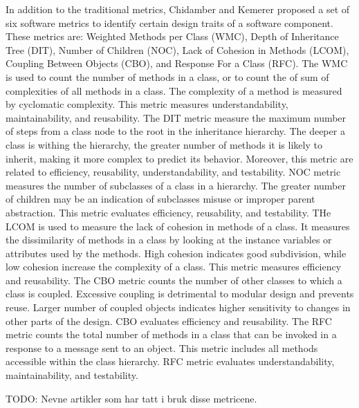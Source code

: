 In addition to the traditional metrics, Chidamber and Kemerer\cite{chidamber1994metrics} proposed a set of six software metrics to identify certain design traits of a software component. These metrics are: Weighted Methods per Class (WMC), Depth of Inheritance Tree (DIT), Number of Children (NOC), Lack of Cohesion in Methods (LCOM), Coupling Between Objects (CBO), and Response For a Class (RFC). The WMC is used to count the number of methods in a class, or to count the of sum of complexities of all methods in a class. The complexity of a method is measured by cyclomatic complexity. This metric measures understandability, maintainability, and reusability\cite{quenelobject}. The DIT metric measure the maximum number of steps from a class node to the root in the inheritance hierarchy. The deeper a class is withing the hierarchy, the greater number of methods it is likely to inherit, making it more complex to predict its behavior\cite{quenelobject}. Moreover, this metric are related to efficiency, reusability, understandability, and testability\cite{quenelobject}. NOC metric measures the number of subclasses of a class in a hierarchy. The greater number of children may be an indication of subclasses misuse or improper parent abstraction. This metric evaluates efficiency, reusability, and testability\cite{quenelobject}. THe LCOM is used to measure the lack of cohesion in methods of a class. It measures the dissimilarity of methods in a class by looking at the instance variables or attributes used by the methods. High cohesion indicates good subdivision, while low cohesion increase the complexity of a class. This metric measures efficiency and reusability\cite{quenelobject}. The CBO metric counts the number of other classes to which a class is coupled. Excessive coupling is detrimental to modular design and prevents reuse\cite{quenelobject}. Larger number of coupled objects indicates higher sensitivity to changes in other parts of the design. CBO evaluates efficiency and reusability\cite{quenelobject}. The RFC metric counts the total number of methods in a class that can be invoked in a response to a message sent to an object. This metric includes all methods accessible within the class hierarchy. RFC metric evaluates understandability, maintainability, and testability\cite{quenelobject}.

TODO: Nevne artikler som har tatt i bruk disse metricene.




